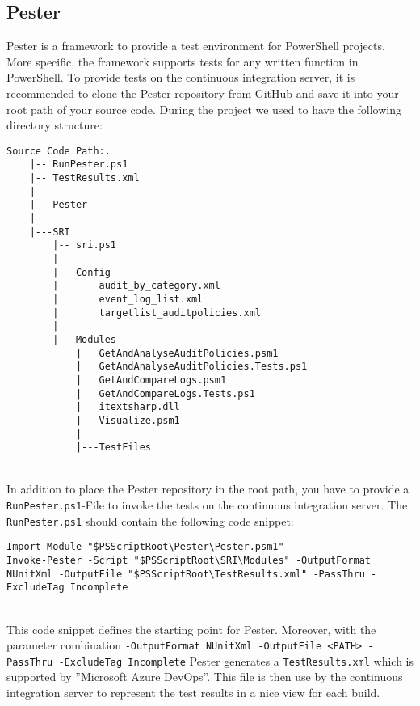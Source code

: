 
\thispagestyle{plain}
\renewcommand\section{\stdsection}
\setcounter{section}{4}
\subsection{Pester}
Pester is a framework to provide a test environment for PowerShell projects. More specific, the framework supports tests for any written function in PowerShell. To provide tests on the continuous integration server, it is recommended to clone the Pester repository from GitHub and save it into your root path of your source code. During the project we used to have the following directory structure: \\
\begin{lstlisting}
Source Code Path:.
    |-- RunPester.ps1
    |-- TestResults.xml
    |
    |---Pester
    |
    |---SRI
        |-- sri.ps1
        |
        |---Config
        |       audit_by_category.xml
        |       event_log_list.xml
        |       targetlist_auditpolicies.xml
        |
        |---Modules
            |   GetAndAnalyseAuditPolicies.psm1
            |   GetAndAnalyseAuditPolicies.Tests.ps1
            |   GetAndCompareLogs.psm1
            |   GetAndCompareLogs.Tests.ps1
            |   itextsharp.dll
            |   Visualize.psm1
            |
            |---TestFiles
\end{lstlisting}\ \\
In addition to place the Pester repository in the root path, you have to provide a \lstinline|RunPester.ps1|-File to invoke the tests on the continuous integration server. The \lstinline|RunPester.ps1| should contain the following code snippet:
\begin{lstlisting}
Import-Module "$PSScriptRoot\Pester\Pester.psm1"  
Invoke-Pester -Script "$PSScriptRoot\SRI\Modules" -OutputFormat NUnitXml -OutputFile "$PSScriptRoot\TestResults.xml" -PassThru -ExcludeTag Incomplete
\end{lstlisting} \ \\
This code snippet defines the starting point for Pester. Moreover, with the parameter combination \lstinline|-OutputFormat NUnitXml -OutputFile <PATH> -PassThru -ExcludeTag Incomplete| Pester generates a \lstinline|TestResults.xml| which is supported by ''Microsoft Azure DevOps''. This file is then use by the continuous integration server to represent the test results in a nice view for each build.